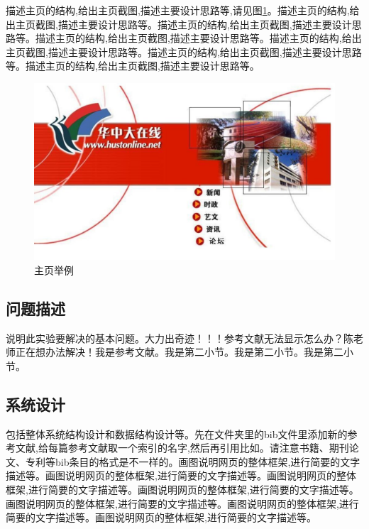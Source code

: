 \documentclass[supercite]{Experimental_Report}
\theoremstyle{definition}
\begin{document}
描述主页的结构,给出主页截图,描述主要设计思路等,请见图\ref{fig2-1}。描述主页的结构,给出主页截图,描述主要设计思路等。描述主页的结构,给出主页截图,描述主要设计思路等。描述主页的结构,给出主页截图,描述主要设计思路等。描述主页的结构,给出主页截图,描述主要设计思路等。描述主页的结构,给出主页截图,描述主要设计思路等。描述主页的结构,给出主页截图,描述主要设计思路等。

\begin{figure}[htb]
	\begin{center}
		\includegraphics[scale=0.40]{images/2-1.jpg}
		\caption{主页举例}
		\label{fig2-1}
	\end{center}
\end{figure}

\subsection{问题描述}

说明此实验要解决的基本问题。大力出奇迹！！！参考文献无法显示怎么办？陈老师正在想办法解决\cite{STR2021Neurocom, AVS2021Neurocom}！我是参考文献。我是第二小节\cite{Mehrabian1974An}。我是第二小节\cite{Rezaei2014CVPR}。我是第二小节\cite{Ramnath2008IJCV}。

\subsection{系统设计}

包括整体系统结构设计和数据结构设计等。先在文件夹里的bib文件里添加新的参考文献,给每篇参考文献取一个索引的名字,然后再引用比如\cite{STR2021Neurocom}\cite{AVS2021Neurocom, Rezaei2014CVPR}。请注意书籍、期刊论文、专利等bib条目的格式是不一样的。画图说明网页的整体框架,进行简要的文字描述等。画图说明网页的整体框架,进行简要的文字描述等。画图说明网页的整体框架,进行简要的文字描述等。画图说明网页的整体框架,进行简要的文字描述等。画图说明网页的整体框架,进行简要的文字描述等。画图说明网页的整体框架,进行简要的文字描述等。画图说明网页的整体框架,进行简要的文字描述等。
\end{document}
